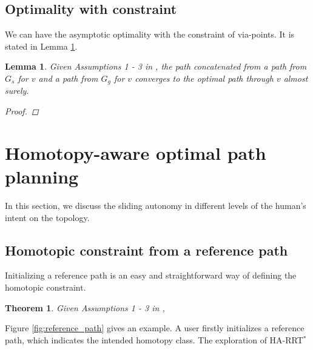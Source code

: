 \documentclass[letterpaper, 10 pt, conference]{ieeeconf}
\newtheorem{thm}{Theorem}
\newtheorem{lem}{Lemma}
\begin{document}
\subsection{Optimality with constraint}

We can have the asymptotic optimality with the constraint of via-points.
It is stated in Lemma \ref{lem:optimal_via_point}.

\begin{lem}
\label{lem:optimal_via_point}
Given Assumptions 1 - 3 in \cite{Karaman-RSS-10},
the path concatenated from a path from $ G_{s} $ for $ v $ and a path from $ G_{g} $ for $ v $ converges to the optimal path through $ v $ almost surely. 
\begin{proof}
\end{proof}
\end{lem}




\section{Homotopy-aware optimal path planning}
\label{sec:application}

In this section, we discuss the sliding autonomy in different levels of the human's intent on the topology.

\subsection{Homotopic constraint from a reference path}

Initializing a reference path is an easy and straightforward way of defining the homotopic constraint.

\begin{thm}
\label{thm:constrained_optimality}
Given Assumptions 1 - 3 in \cite{Karaman-RSS-10},
\end{thm}

Figure \ref{fig:reference_path} gives an example.
A user firstly initializes a reference path, which indicates the intended homotopy class.
The exploration of HA-RRT$^{*}$
\end{document}
